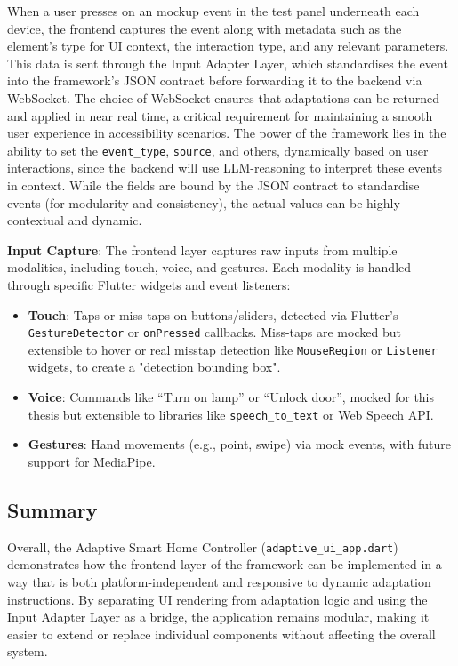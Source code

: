 \documentclass[openany]{book}
\begin{document}
When a user presses on an mockup event in the test panel underneath each device, the frontend captures the event along with metadata such as the element’s type for UI context, the interaction type, and any relevant parameters. This data is sent through the Input Adapter Layer, which standardises the event into the framework’s JSON contract before forwarding it to the backend via WebSocket. The choice of WebSocket ensures that adaptations can be returned and applied in near real time, a critical requirement for maintaining a smooth user experience in accessibility scenarios. The power of the framework lies in the ability to set the \texttt{event\_type}, \texttt{source}, and others, dynamically based on user interactions, since the backend will use LLM-reasoning to interpret these events in context. While the fields are bound by the JSON contract to standardise events (for modularity and consistency), the actual values can be highly contextual and dynamic.

\textbf{Input Capture}: The frontend layer captures raw inputs from multiple modalities, including touch, voice, and gestures. Each modality is handled through specific Flutter widgets and event listeners:
\begin{itemize}
    \item \textbf{Touch}: Taps or miss-taps on buttons/sliders, detected via Flutter’s \verb|GestureDetector| or \verb|onPressed| callbacks. Miss-taps are mocked but extensible to hover or real misstap detection like \verb|MouseRegion| or \verb|Listener| widgets, to create a "detection bounding box".
    \item \textbf{Voice}: Commands like “Turn on lamp” or “Unlock door”, mocked for this thesis but extensible to libraries like \verb|speech_to_text| or Web Speech API.
    \item \textbf{Gestures}: Hand movements (e.g., point, swipe) via mock events, with future support for MediaPipe.
\end{itemize}

\subsection{Summary}
Overall, the Adaptive Smart Home Controller (\texttt{adaptive\_ui\_app.dart}) demonstrates how the frontend layer of the framework can be implemented in a way that is both platform-independent and responsive to dynamic adaptation instructions. By separating UI rendering from adaptation logic and using the Input Adapter Layer as a bridge, the application remains modular, making it easier to extend or replace individual components without affecting the overall system.
\end{document}
